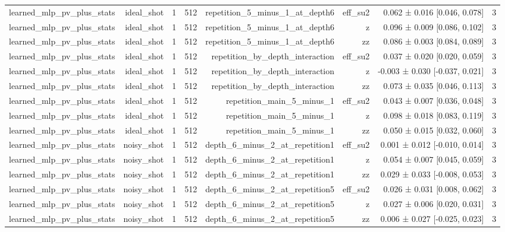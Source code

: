 \begin{table}
\begin{tabular}{lrrrrrrr}
learned\_mlp\_pv\_plus\_stats & ideal\_shot & 1 & 512 & repetition\_5\_minus\_1\_at\_depth6 & eff\_su2 & 0.062 ± 0.016 [0.046, 0.078] & 3 \\
learned\_mlp\_pv\_plus\_stats & ideal\_shot & 1 & 512 & repetition\_5\_minus\_1\_at\_depth6 & z & 0.096 ± 0.009 [0.086, 0.102] & 3 \\
learned\_mlp\_pv\_plus\_stats & ideal\_shot & 1 & 512 & repetition\_5\_minus\_1\_at\_depth6 & zz & 0.086 ± 0.003 [0.084, 0.089] & 3 \\
learned\_mlp\_pv\_plus\_stats & ideal\_shot & 1 & 512 & repetition\_by\_depth\_interaction & eff\_su2 & 0.037 ± 0.020 [0.020, 0.059] & 3 \\
learned\_mlp\_pv\_plus\_stats & ideal\_shot & 1 & 512 & repetition\_by\_depth\_interaction & z & -0.003 ± 0.030 [-0.037, 0.021] & 3 \\
learned\_mlp\_pv\_plus\_stats & ideal\_shot & 1 & 512 & repetition\_by\_depth\_interaction & zz & 0.073 ± 0.035 [0.046, 0.113] & 3 \\
learned\_mlp\_pv\_plus\_stats & ideal\_shot & 1 & 512 & repetition\_main\_5\_minus\_1 & eff\_su2 & 0.043 ± 0.007 [0.036, 0.048] & 3 \\
learned\_mlp\_pv\_plus\_stats & ideal\_shot & 1 & 512 & repetition\_main\_5\_minus\_1 & z & 0.098 ± 0.018 [0.083, 0.119] & 3 \\
learned\_mlp\_pv\_plus\_stats & ideal\_shot & 1 & 512 & repetition\_main\_5\_minus\_1 & zz & 0.050 ± 0.015 [0.032, 0.060] & 3 \\
learned\_mlp\_pv\_plus\_stats & noisy\_shot & 1 & 512 & depth\_6\_minus\_2\_at\_repetition1 & eff\_su2 & 0.001 ± 0.012 [-0.010, 0.014] & 3 \\
learned\_mlp\_pv\_plus\_stats & noisy\_shot & 1 & 512 & depth\_6\_minus\_2\_at\_repetition1 & z & 0.054 ± 0.007 [0.045, 0.059] & 3 \\
learned\_mlp\_pv\_plus\_stats & noisy\_shot & 1 & 512 & depth\_6\_minus\_2\_at\_repetition1 & zz & 0.029 ± 0.033 [-0.008, 0.053] & 3 \\
learned\_mlp\_pv\_plus\_stats & noisy\_shot & 1 & 512 & depth\_6\_minus\_2\_at\_repetition5 & eff\_su2 & 0.026 ± 0.031 [0.008, 0.062] & 3 \\
learned\_mlp\_pv\_plus\_stats & noisy\_shot & 1 & 512 & depth\_6\_minus\_2\_at\_repetition5 & z & 0.027 ± 0.006 [0.020, 0.031] & 3 \\
learned\_mlp\_pv\_plus\_stats & noisy\_shot & 1 & 512 & depth\_6\_minus\_2\_at\_repetition5 & zz & 0.006 ± 0.027 [-0.025, 0.023] & 3 \\

\end{tabular}
\end{table}
